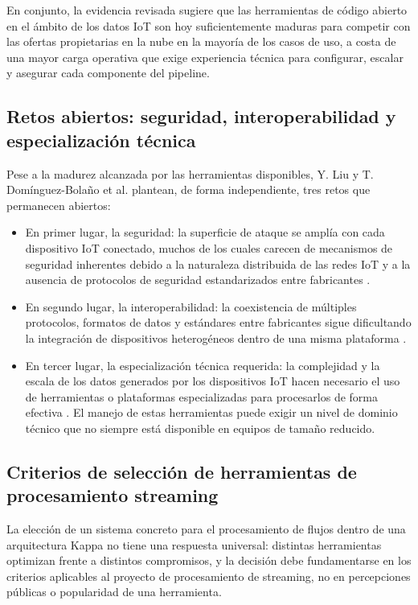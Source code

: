 En conjunto, la evidencia revisada sugiere que las herramientas de código abierto en el ámbito de los datos IoT son hoy suficientemente maduras para competir con las ofertas propietarias en la nube en la mayoría de los casos de uso, a costa de una mayor carga operativa que exige experiencia técnica para configurar, escalar y asegurar cada componente del pipeline.

\subsection{Retos abiertos: seguridad, interoperabilidad y especialización técnica}

Pese a la madurez alcanzada por las herramientas disponibles, Y. Liu \cite{liu2025} y T. Domínguez-Bolaño et al. \cite{dominguez2022} plantean, de forma independiente, tres retos que permanecen abiertos:

\begin{itemize}
    \item En primer lugar, la seguridad: la superficie de ataque se amplía con cada dispositivo IoT conectado, muchos de los cuales carecen de mecanismos de seguridad inherentes debido a la naturaleza distribuida de las redes IoT y a la ausencia de protocolos de seguridad estandarizados entre fabricantes \cite{liu2025}. 
    \item En segundo lugar, la interoperabilidad: la coexistencia de múltiples protocolos, formatos de datos y estándares entre fabricantes sigue dificultando la integración de dispositivos heterogéneos dentro de una misma plataforma \cite{dominguez2022}. 
    \item En tercer lugar, la especialización técnica requerida: la complejidad y la escala de los datos generados por los dispositivos IoT hacen necesario el uso de herramientas o plataformas especializadas para procesarlos de forma efectiva \cite{liu2025}. El manejo de estas herramientas puede exigir un nivel de dominio técnico que no siempre está disponible en equipos de tamaño reducido.
\end{itemize}

\subsection{Criterios de selección de herramientas de procesamiento streaming}
\label{sec:criterios-streaming}

La elección de un sistema concreto para el procesamiento de flujos dentro de una arquitectura Kappa no tiene una respuesta universal: distintas herramientas optimizan frente a distintos compromisos, y la decisión debe fundamentarse en los criterios aplicables al proyecto de procesamiento de streaming, no en percepciones públicas o popularidad de una herramienta. 

